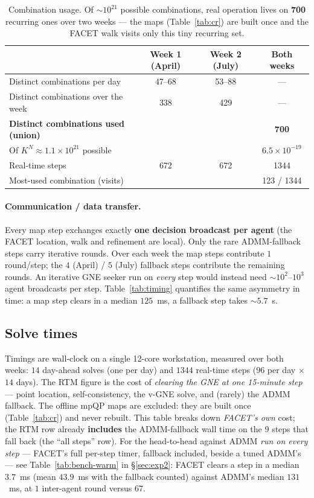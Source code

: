 \documentclass[11pt, letterpaper]{article}
\begin{document}
\begin{table}[H]\centering
\begin{tabular}{lccc}
\toprule
& Week 1 (April) & Week 2 (July) & Both weeks\\
\midrule
Distinct combinations per day & 47--68 & 53--88 & ---\\
Distinct combinations over the week & 338 & 429 & ---\\
\textbf{Distinct combinations used (union)} & & & \textbf{700}\\
Of $K^N\approx1.1\times10^{21}$ possible & & & $6.5\times10^{-19}$\\
Real-time steps & 672 & 672 & 1344\\
Most-used combination (visits) & & & 123 / 1344\\
\bottomrule
\end{tabular}
\caption{Combination usage. Of $\sim\!10^{21}$ possible combinations, real operation lives on
\textbf{700} recurring ones over two weeks --- the maps (Table~\ref{tab:cr}) are built once and the
FACET walk visits only this tiny recurring set.}
\end{table}

\paragraph{Communication / data transfer.} Every map step exchanges exactly \textbf{one decision
broadcast per agent} (the FACET location, walk and refinement are local). Only the rare ADMM-fallback
steps carry iterative rounds. Over each week the map steps contribute $1$ round/step; the $4$
(April) / $5$ (July) fallback steps contribute the remaining rounds. An iterative GNE seeker
run on \emph{every} step would instead need $\sim\!10^2$--$10^3$ agent broadcasts per step.
Table~\ref{tab:timing} quantifies the same asymmetry in time: a map step clears in a median
$125$~ms, a fallback step takes $\sim\!5.7$~s.

\subsection{Solve times}\label{sec:timing}
Timings are wall-clock on a single 12-core workstation, measured over both weeks: $14$ day-ahead
solves (one per day) and $1344$ real-time steps ($96$ per day $\times$ $14$ days). The RTM figure is
the cost of \emph{clearing the GNE at one 15-minute step} --- point location, self-consistency,
the v-GNE solve, and (rarely) the ADMM fallback. The offline mpQP maps are excluded: they are
built once (Table~\ref{tab:cr}) and never rebuilt. This table breaks down \emph{FACET's own} cost;
the RTM row already \textbf{includes} the ADMM-fallback wall time on the $9$ steps that fall back
(the ``all steps'' row). For the head-to-head against ADMM \emph{run on every step} --- FACET's full
per-step timer, fallback included, beside a tuned ADMM's --- see Table~\ref{tab:bench-warm} in
\S\ref{sec:exp2}: FACET clears a step in a median $3.7$~ms (mean $43.9$~ms with the fallback counted)
against ADMM's median $131$~ms, at $1$ inter-agent round versus $67$.
\end{document}
